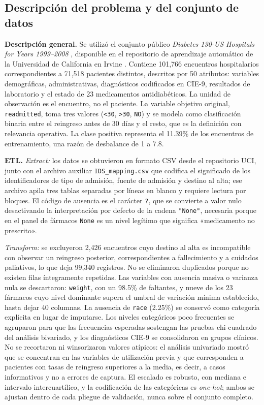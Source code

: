 \documentclass[pdflatex,sn-mathphys-num]{sn-jnl}
\begin{document}
\subsection{Descripción del problema y del conjunto de datos}\label{subsec:datos}

\textbf{Descripción general.} Se utilizó el conjunto público \emph{Diabetes 130-US Hospitals for Years 1999--2008} \cite{bib_strack}, disponible en el repositorio de aprendizaje automático de la Universidad de California en Irvine \cite{bib_uci}. Contiene 101{,}766 encuentros hospitalarios correspondientes a 71{,}518 pacientes distintos, descritos por 50 atributos: variables demográficas, administrativas, diagnósticos codificados en CIE-9, resultados de laboratorio y el estado de 23 medicamentos antidiabéticos. La unidad de observación es el encuentro, no el paciente. La variable objetivo original, \texttt{readmitted}, toma tres valores (\texttt{<30}, \texttt{>30}, \texttt{NO}) y se modela como clasificación binaria entre el reingreso antes de 30 días y el resto, que es la definición con relevancia operativa. La clase positiva representa el 11.39\% de los encuentros de entrenamiento, una razón de desbalance de 1 a 7.8.

\textbf{ETL.} \emph{Extract:} los datos se obtuvieron en formato CSV desde el repositorio UCI, junto con el archivo auxiliar \texttt{IDS\_mapping.csv} que codifica el significado de los identificadores de tipo de admisión, fuente de admisión y destino al alta; ese archivo apila tres tablas separadas por líneas en blanco y requiere lectura por bloques. El código de ausencia es el carácter \texttt{?}, que se convierte a valor nulo desactivando la interpretación por defecto de la cadena \texttt{"None"}, necesaria porque en el panel de fármacos \texttt{None} es un nivel legítimo que significa «medicamento no prescrito».

\emph{Transform:} se excluyeron 2{,}426 encuentros cuyo destino al alta es incompatible con observar un reingreso posterior, correspondientes a fallecimiento y a cuidados paliativos, lo que deja 99{,}340 registros. No se eliminaron duplicados porque no existen filas íntegramente repetidas. Las variables con ausencia masiva o varianza nula se descartaron: \texttt{weight}, con un 98.5\% de faltantes, y nueve de los 23 fármacos cuyo nivel dominante supera el umbral de variación mínima establecido, hasta dejar 40 columnas. La ausencia de \texttt{race} (2.25\%) se conservó como categoría explícita en lugar de imputarse. Los niveles categóricos poco frecuentes se agruparon para que las frecuencias esperadas sostengan las pruebas chi-cuadrado del análisis bivariado, y los diagnósticos CIE-9 se consolidaron en grupos clínicos. No se recortaron ni winsorizaron valores atípicos: el análisis univariado mostró que se concentran en las variables de utilización previa y que corresponden a pacientes con tasas de reingreso superiores a la media, es decir, a casos informativos y no a errores de captura. El escalado es robusto, con mediana e intervalo intercuartílico, y la codificación de las categóricas es \emph{one-hot}; ambos se ajustan dentro de cada pliegue de validación, nunca sobre el conjunto completo.
\end{document}
